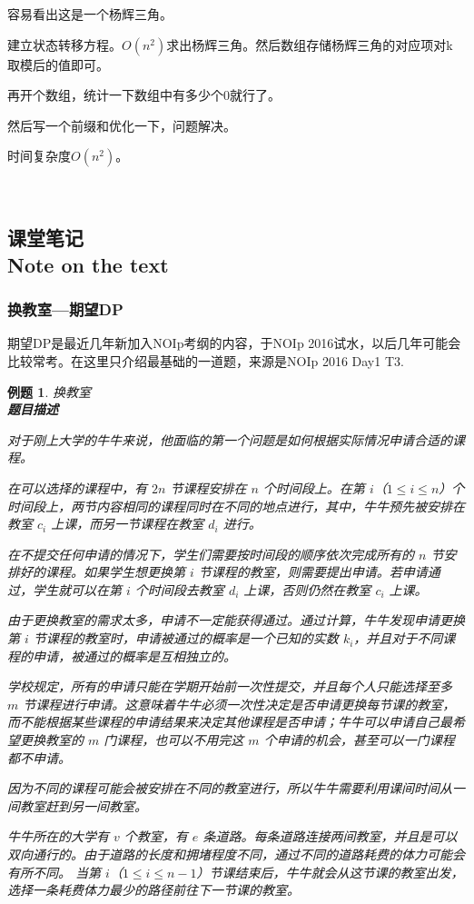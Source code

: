 \documentclass{article}
\newtheorem{example}{例题}[subsection]
\theoremstyle{nonumberplain}
\newcommand{\note}{\ \par


	\subsection*{课堂笔记\\\tiny{Note on the text}}
	\newpage}
\begin{document}
	容易看出这是一个杨辉三角。

	建立状态转移方程。$O(n^2)$求出杨辉三角。然后数组存储杨辉三角的对应项对k取模后的值即可。

	再开个数组，统计一下数组中有多少个0就行了。

	然后写一个前缀和优化一下，问题解决。

	时间复杂度$O(n^2)$。

	\note

	\subsubsection{换教室---期望DP}
	期望DP是最近几年新加入NOIp考纲的内容，于NOIp 2016试水，以后几年可能会比较常考。在这里只介绍最基础的一道题，来源是NOIp 2016 Day1 T3.

	\begin{example} 换教室\\
		\textbf{题目描述}

		对于刚上大学的牛牛来说，他面临的第一个问题是如何根据实际情况申请合适的课程。

		在可以选择的课程中，有 $2n$ 节课程安排在 $n$ 个时间段上。在第 $i$（$1 \leq i \leq n$）个时间段上，两节内容相同的课程同时在不同的地点进行，其中，牛牛预先被安排在教室 $c_i$ 上课，而另一节课程在教室 $d_i$ 进行。

		在不提交任何申请的情况下，学生们需要按时间段的顺序依次完成所有的 $n$ 节安排好的课程。如果学生想更换第 $i$ 节课程的教室，则需要提出申请。若申请通过，学生就可以在第 $i$ 个时间段去教室 $d_i$ 上课，否则仍然在教室 $c_i$ 上课。

		由于更换教室的需求太多，申请不一定能获得通过。通过计算，牛牛发现申请更换第 $i$ 节课程的教室时，申请被通过的概率是一个已知的实数 $k_i$，并且对于不同课程的申请，被通过的概率是互相独立的。

		学校规定，所有的申请只能在学期开始前一次性提交，并且每个人只能选择至多 $m$ 节课程进行申请。这意味着牛牛必须一次性决定是否申请更换每节课的教室，而不能根据某些课程的申请结果来决定其他课程是否申请；牛牛可以申请自己最希望更换教室的 $m$ 门课程，也可以不用完这 $m$ 个申请的机会，甚至可以一门课程都不申请。

		因为不同的课程可能会被安排在不同的教室进行，所以牛牛需要利用课间时间从一间教室赶到另一间教室。

		牛牛所在的大学有 $v$ 个教室，有 $e$ 条道路。每条道路连接两间教室，并且是可以双向通行的。由于道路的长度和拥堵程度不同，通过不同的道路耗费的体力可能会有所不同。 当第 $i$（$1 \leq i \leq n-1$）节课结束后，牛牛就会从这节课的教室出发，选择一条耗费体力最少的路径前往下一节课的教室。


\end{example}
\end{document}
